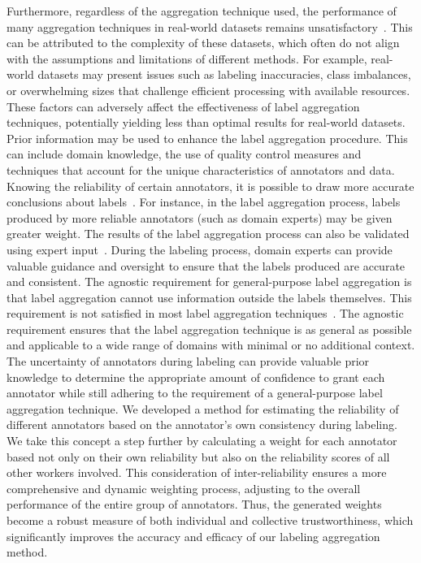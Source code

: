 Furthermore, regardless of the aggregation technique used, the performance of many aggregation techniques in real-world datasets remains unsatisfactory~\cite{liu_Exploiting_2021}. This can be attributed to the complexity of these datasets, which often do not align with the assumptions and limitations of different methods. For example, real-world datasets may present issues such as labeling inaccuracies, class imbalances, or overwhelming sizes that challenge efficient processing with available resources. These factors can adversely affect the effectiveness of label aggregation techniques, potentially yielding less than optimal results for real-world datasets.
Prior information may be used to enhance the label aggregation procedure.
This can include domain knowledge, the use of quality control measures and techniques that account for the unique characteristics of annotators and data. Knowing the reliability of certain annotators, it is possible to draw more accurate conclusions about labels~\cite{li_Crowdsourced_2017}. For instance, in the label aggregation process, labels produced by more reliable annotators (such as domain experts) may be given greater weight. The results of the label aggregation process can also be validated using expert input~\cite{liu_Improving_2017}. During the labeling process, domain experts can provide valuable guidance and oversight to ensure that the labels produced are accurate and consistent.
The agnostic requirement for general-purpose label aggregation is that label aggregation cannot use information outside the labels themselves. This requirement is not satisfied in most label aggregation techniques~\cite{zhang_Crowdsourced_2019}. The agnostic requirement ensures that the label aggregation technique is as general as possible and applicable to a wide range of domains with minimal or no additional context.
The uncertainty of annotators during labeling can provide valuable prior knowledge to determine the appropriate amount of confidence to grant each annotator while still adhering to the requirement of a general-purpose label aggregation technique. We developed a method for estimating the reliability of different annotators based on the annotator's own consistency during labeling. We take this concept a step further by calculating a weight for each annotator based not only on their own reliability but also on the reliability scores of all other workers involved. This consideration of inter-reliability ensures a more comprehensive and dynamic weighting process, adjusting to the overall performance of the entire group of annotators. Thus, the generated weights become a robust measure of both individual and collective trustworthiness, which significantly improves the accuracy and efficacy of our labeling aggregation method.
